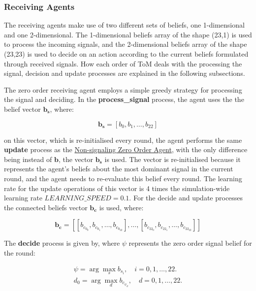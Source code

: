 \subsubsection{Receiving Agents}

The receiving agents make use of two different sets of beliefs, one 1-dimensional and one 2-dimensional. The 1-dimensional beliefs array of the shape (23,1) is used to process the incoming signals, and the 2-dimensional beliefs array of the shape (23,23) is used to decide on an action according to the current beliefs formulated through received signals. How each order of ToM deals with the processing the signal, decision and update processes are explained in the following subsections.


The zero order receiving agent employs a simple greedy strategy for processing the signal and deciding. In the \textbf{process\_signal} process, the agent uses the the belief vector $\mathbf{b_s}$, where:

\[
\mathbf{b_s} = [b_{0}, b_{1}, \ldots, b_{22}]
\]

on this vector, which is re-initialised every round, the agent performs the same \textbf{update} process as the \hyperref[eq:zero-order-update]{Non-signaling Zero Order Agent}, with the only difference being instead of $\mathbf{b}$, the vector $\mathbf{b_s}$ is used. The vector is re-initialised because it represents the agent's beliefs about the most dominant signal in the current round, and the agent needs to re-evaluate this belief every round. The learning rate for the update operations of this vector is 4 times the simulation-wide learning rate $LEARNING\_SPEED = 0.1$.
For the decide and update processes the connected beliefs vector $\mathbf{b_c}$ is used, where:

\[
\mathbf{b_c} = [[b_{c_{0_{0}}}, b_{c_{0_{1}}}, \ldots, b_{c_{0_{22}}}], \ldots, [b_{c_{22_{0}}}, b_{c_{22_{1}}}, \ldots, b_{c_{22_{22}}}]]
\]

The \textbf{decide} process is given by, where $\psi$ represents the zero order signal belief for the round:

\begin{equation*}
\begin{aligned}
    \psi = \arg\max_s b_{s_i}, \quad i = 0, 1, \ldots, 22. \\
    d_0 = \arg\max_d b_{c_{{\psi}_d}}, \quad d = 0, 1, \ldots, 22.
\end{aligned}
\end{equation*}

